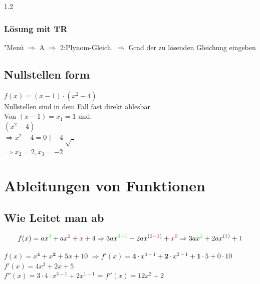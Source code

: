 \documentclass{article}
\newcommand{\Zeilenabstand}{1.2}
\begin{document}
\begin{spacing}{\Zeilenabstand}
    \subsubsection{Lösung mit TR}
    "Menü $\Rightarrow$ A $\Rightarrow$ 2:Plynom-Gleich. $\Rightarrow$ Grad der zu lösenden Gleichung eingeben

    \subsection{Nullstellen form}
    $f(x)= (x-1) \cdot (x^2-4)$\\
    Nullstellen sind in dem Fall fast direkt ablesbar\\
    Von $(x-1) = x_1=1$ und: \\
    $(x^2-4) $\\
    $\Rightarrow x^2 - 4 = 0$ $\vert -4$ $ \sqrt{\ \ }$\\
    $\Rightarrow x_2=2,x_3=-2$
    \newpage











        \section{Ableitungen von Funktionen}
            \subsection{Wie Leitet man ab}
                \begin{equation}
                    f(x)= ax^{{\color{green}3}}+ax^{{\color{red}2}}+{\color{purple}x}+4 \Rightarrow 3ax^{\color{green}3-1}+2ax^{({\color{red}2-1})}+{\color{purple}x^{0}} \Rightarrow 3ax^{\color{green}2}+2ax^{({\color{red}1})}+{\color{purple}1}
                \end{equation}

                $f(x)= x\mathbf{^4}+ x\mathbf{^2} +5x +10$ $\Rightarrow f'(x)= \mathbf{4}\cdot x^{4-1} + \mathbf{2} \cdot x^{2-1} + \mathbf{1}\cdot 5 + 0 \cdot 10 $ \\
                $f'(x)= 4x^3+ 2x +5 $\\
                $f''(x)= 3 \cdot 4 \cdot x^{3-1} + 2x^{1-1} $ = $f''(x)=12x^2 +2 $


\end{spacing}
\end{document}
